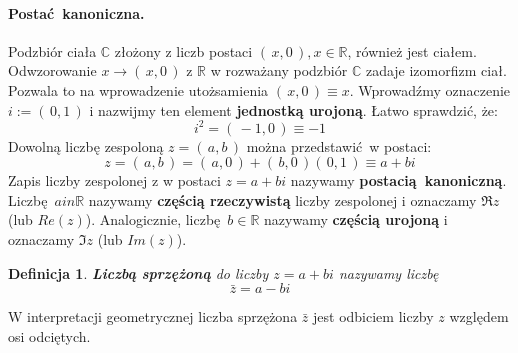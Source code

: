 \documentclass{article}
\newcommand*\conj[1]{\bar{#1}}
\newtheorem{definition}{Definicja}[section]
\begin{document}
    \paragraph{Postać kanoniczna.} Podzbiór ciała $\mathds{C}$ złożony z liczb postaci $(\,x,0\,), x \in \mathds{R}$, również jest ciałem. Odwzorowanie $x \rightarrow (\,x,0\,)$ z $\mathds{R}$ w rozważany podzbiór $\mathds{C}$ zadaje izomorfizm ciał. Pozwala to na wprowadzenie utożsamienia $(\,x,0\,) \equiv x$. Wprowadźmy oznaczenie $i := (\,0,1\,)$ i nazwijmy ten element \textbf{jednostką urojoną}. Łatwo sprawdzić, że:
    \begin{equation*}
        i^2 = (\,-1,0\,) \equiv -1
    \end{equation*}
    Dowolną liczbę zespoloną $z = (\,a,b\,)$ można przedstawić w postaci:
    \begin{equation*}
        z = (\,a,b\,) = (\,a,0\,) + (\,b,0\,)(\,0,1\,) \equiv a+bi
    \end{equation*}
    Zapis liczby zespolonej z w postaci $z = a+bi$ nazywamy \textbf{postacią kanoniczną}. Liczbę $a in \mathds{R}$ nazywamy \textbf{częścią rzeczywistą} liczby zespolonej i oznaczamy $\Re{z}$ (lub $Re(z)$). Analogicznie, liczbę $b \in \mathds{R}$ nazywamy \textbf{częścią urojoną} i oznaczamy $\Im{z}$ (lub $Im(z)$).
    \begin{definition}
        \textbf{Liczbą sprzężoną} do liczby $z = a+bi$ nazywamy liczbę
        \begin{equation*}
            \conj{z} = a-bi
        \end{equation*}
    \end{definition}
    \begin{center}
    \end{center}
    W interpretacji geometrycznej liczba sprzężona $\conj{z}$ jest odbiciem liczby $z$ względem osi odciętych.
\end{document}
